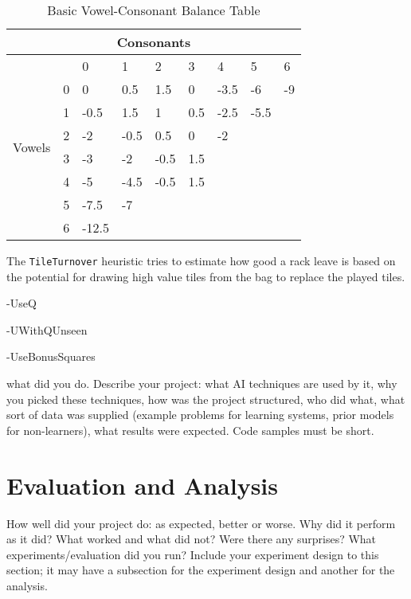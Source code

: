 \documentclass[letterpaper]{article}
\begin{document}
\begin{table}[h]
\caption {Basic Vowel-Consonant Balance Table}
\begin{tabular}{|c|l|l|l|l|l|l|l|l|}
\hline
\multicolumn{9}{|c|}{Consonants}                                           \\ \hline
\multirow{8}{*}{Vowels} &   & 0     & 1    & 2    & 3   & 4    & 5    & 6  \\ \cline{2-9} 
                        & 0 & 0     & 0.5  & 1.5  & 0   & -3.5 & -6   & -9 \\ \cline{2-9} 
                        & 1 & -0.5  & 1.5  & 1    & 0.5 & -2.5 & -5.5 &    \\ \cline{2-9} 
                        & 2 & -2    & -0.5 & 0.5  & 0   & -2   &      &    \\ \cline{2-9} 
                        & 3 & -3    & -2   & -0.5 & 1.5 &      &      &    \\ \cline{2-9} 
                        & 4 & -5    & -4.5 & -0.5 & 1.5 &      &      &    \\ \cline{2-9} 
                        & 5 & -7.5  & -7   &      &     &      &      &    \\ \cline{2-9} 
                        & 6 & -12.5 &      &      &     &      &      &    \\ \hline
\end{tabular}
\end{table}


The \texttt{TileTurnover} heuristic tries to estimate how good a rack leave is based on the potential for drawing high value tiles from the bag to replace the played tiles.

-UseQ

-UWithQUnseen


-UseBonusSquares




what did you do. Describe your project: what AI techniques are used by it, why you picked these techniques, how was the project structured, who did what, what sort of data was supplied (example problems for learning systems, prior models for non-learners), what results were expected. Code samples must be short.

\section{Evaluation and Analysis}
How well did your project do: as expected, better or worse. Why did it perform as it did? What worked and what did not? Were there any surprises? What experiments/evaluation did you run? Include your experiment design to this section; it may have a subsection for the experiment design and another for the analysis.
\end{document}
